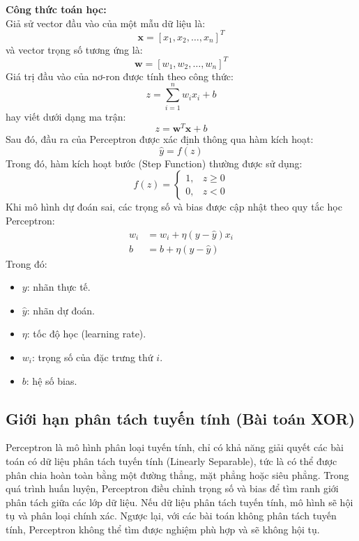 \documentclass[12pt,a4paper]{report}
\begin{document}
\textbf{Công thức toán học:} \\
Giả sử vector đầu vào của một mẫu dữ liệu là:
\begin{equation}
    \mathbf{x} = [x_1, x_2, \dots, x_n]^T
\end{equation}
và vector trọng số tương ứng là:
\begin{equation}
    \mathbf{w} = [w_1, w_2, \dots, w_n]^T
\end{equation}
Giá trị đầu vào của nơ-ron được tính theo công thức:
\begin{equation}
    z = \sum_{i=1}^n w_i x_i + b
\end{equation}
hay viết dưới dạng ma trận:
\begin{equation}
    z = \mathbf{w}^T \mathbf{x} + b
\end{equation}
Sau đó, đầu ra của Perceptron được xác định thông qua hàm kích hoạt:
\begin{equation}
    \hat{y} = f(z)
\end{equation}
Trong đó, hàm kích hoạt bước (Step Function) thường được sử dụng:
\begin{equation}
    f(z) = \begin{cases} 1, & z \ge 0 \\ 0, & z < 0 \end{cases}
\end{equation}
Khi mô hình dự đoán sai, các trọng số và bias được cập nhật theo quy tắc học Perceptron:
\begin{align}
    w_i &= w_i + \eta(y - \hat{y})x_i \\
    b &= b + \eta(y - \hat{y})
\end{align}
Trong đó:
\begin{itemize}
    \item $y$: nhãn thực tế.
    \item $\hat{y}$: nhãn dự đoán.
    \item $\eta$: tốc độ học (learning rate).
    \item $w_i$: trọng số của đặc trưng thứ $i$.
    \item $b$: hệ số bias.
\end{itemize}

\subsection{Giới hạn phân tách tuyến tính (Bài toán XOR)}
Perceptron là mô hình phân loại tuyến tính, chỉ có khả năng giải quyết các bài toán có dữ liệu phân tách tuyến tính (Linearly Separable), tức là có thể được phân chia hoàn toàn bằng một đường thẳng, mặt phẳng hoặc siêu phẳng. Trong quá trình huấn luyện, Perceptron điều chỉnh trọng số và bias để tìm ranh giới phân tách giữa các lớp dữ liệu. Nếu dữ liệu phân tách tuyến tính, mô hình sẽ hội tụ và phân loại chính xác. Ngược lại, với các bài toán không phân tách tuyến tính, Perceptron không thể tìm được nghiệm phù hợp và sẽ không hội tụ.
\end{document}
